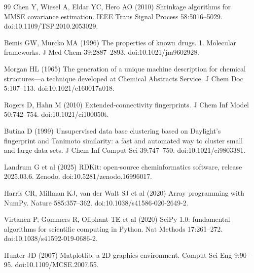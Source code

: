 \begin{thebibliography}{99}
 Chen Y, Wiesel A, Eldar YC, Hero AO (2010) Shrinkage
algorithms for MMSE covariance estimation. IEEE Trans Signal Process
58:5016--5029. doi:10.1109/TSP.2010.2053029.

 Bemis GW, Murcko MA (1996) The properties of known drugs.
1. Molecular frameworks. J Med Chem 39:2887--2893.
doi:10.1021/jm9602928.

 Morgan HL (1965) The generation of a unique machine
description for chemical structures---a technique developed at Chemical
Abstracts Service. J Chem Doc 5:107--113. doi:10.1021/c160017a018.

 Rogers D, Hahn M (2010) Extended-connectivity fingerprints.
J Chem Inf Model 50:742--754. doi:10.1021/ci100050t.

 Butina D (1999) Unsupervised data base clustering based on
Daylight's fingerprint and Tanimoto similarity: a fast and automated way to
cluster small and large data sets. J Chem Inf Comput Sci 39:747--750.
doi:10.1021/ci9803381.

 Landrum G et al (2025) RDKit: open-source cheminformatics
software, release 2025.03.6. Zenodo. doi:10.5281/zenodo.16996017.

 Harris CR, Millman KJ, van der Walt SJ et al (2020) Array
programming with NumPy. Nature 585:357--362.
doi:10.1038/s41586-020-2649-2.

 Virtanen P, Gommers R, Oliphant TE et al (2020) SciPy 1.0:
fundamental algorithms for scientific computing in Python. Nat Methods
17:261--272. doi:10.1038/s41592-019-0686-2.

 Hunter JD (2007) Matplotlib: a 2D graphics environment.
Comput Sci Eng 9:90--95. doi:10.1109/MCSE.2007.55.

\end{thebibliography}
